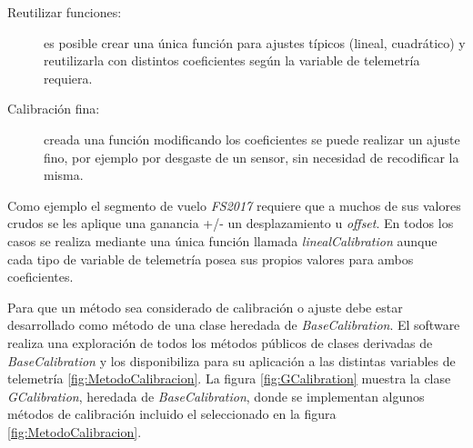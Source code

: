 \documentclass[twoside,twocolumn]{article}
\begin{document}
\begin{description}
 \item [Reutilizar funciones: ] es posible crear una única función para ajustes típicos (lineal, cuadrático) y reutilizarla con distintos coeficientes según la variable de telemetría requiera.
 \item [Calibración fina: ] creada una función modificando los coeficientes se puede realizar un ajuste fino, por ejemplo por desgaste de un sensor, sin necesidad de recodificar la misma.
\end{description}

Como ejemplo el segmento de vuelo \textit{FS2017} requiere que a muchos de sus valores crudos se les aplique una ganancia +/- un desplazamiento u \textit{offset}. En todos los casos se realiza mediante una única función llamada \textit{linealCalibration} aunque cada tipo de variable de telemetría posea sus propios valores para ambos coeficientes.

Para que un método sea considerado de calibración o ajuste debe estar desarrollado como método de una clase heredada de \textit{BaseCalibration}. El software realiza una exploración de todos los métodos públicos de clases derivadas de \textit{BaseCalibration} y los disponibiliza para su aplicación a las distintas variables de telemetría \ref{fig:MetodoCalibracion}. La figura \ref{fig:GCalibration} muestra la clase \textit{GCalibration}, heredada de \textit{BaseCalibration}, donde se implementan algunos métodos de calibración incluido el seleccionado en la figura \ref{fig:MetodoCalibracion}.
\end{document}
